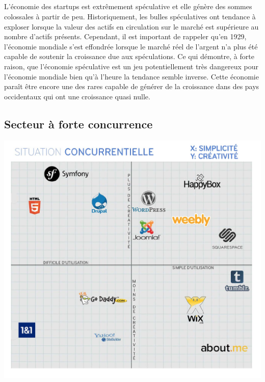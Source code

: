 \documentclass[11pt, a4paper ]{article}
\begin{document}
\begin{spacing}{1.5}
\subparagraph{}
L'économie des startups est extrêmement spéculative et elle génère des sommes colossales à partir de peu. Historiquement, les bulles spéculatives ont tendance à exploser lorsque la valeur des actifs en circulation sur le marché est supérieure au nombre d'actifs présents. Cependant, il est important de rappeler qu'en 1929, l'économie mondiale s'est effondrée lorsque le marché réel de l'argent n'a plus été capable de soutenir la croissance due aux spéculations. Ce qui démontre, à forte raison, que l'économie spéculative est un jeu potentiellement très dangereux pour l'économie mondiale bien qu'à l'heure la tendance semble inverse. Cette économie paraît être encore une des rares capable de générer de la croissance dans des pays occidentaux qui ont une croissance quasi nulle.



\subsection{Secteur à forte concurrence}


\begin{center}
	\includegraphics[width=\textwidth]{images/media/concurenceHBCMS}
\end{center}


\end{spacing}
\end{document}
